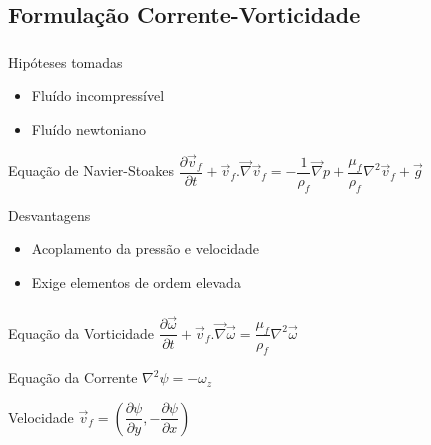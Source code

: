 \documentclass{beamer}
\begin{document}
\subsection{Formulação Corrente-Vorticidade}
\begin{frame}
  \frametitle{\subsecname}
  
  \begin{block}{Hipóteses tomadas}
    \begin{itemize}
     \item Fluído incompressível
     \item Fluído newtoniano
    \end{itemize}
  \end{block}
  
  \begin{block}{Equação de Navier-Stoakes}
    \centering
    $\dfrac{\partial \vec{v}_f}{\partial t} + \vec{v}_f.\vec{\nabla}\vec{v}_f =
    -\dfrac{1}{\rho_f} \vec{\nabla}p + \dfrac{\mu_f}{\rho_f} \nabla^2\vec{v}_f + \vec{g}$
  \end{block}
  
  \begin{block}{Desvantagens}
    \begin{itemize}
     \item Acoplamento da pressão e velocidade
     \item Exige elementos de ordem elevada
    \end{itemize}
  \end{block}

\end{frame}


\begin{frame}
  \frametitle{\subsecname}
  
  \begin{block}{Equação da Vorticidade}
    \centering
    $\dfrac{\partial \vec{\omega}}{\partial t} + \vec{v}_f.\vec{\nabla}\vec{\omega} = \dfrac{\mu_f}{\rho_f} \nabla^2 \vec{\omega}$
  \end{block}
  
  \begin{block}{Equação da Corrente}
    \centering
    $\nabla^2\psi = -\omega_z$
  \end{block}
  
  \begin{block}{Velocidade}
    \centering
    $\vec{v}_f = \left(\dfrac{\partial \psi}{\partial y}, -\dfrac{\partial \psi}{\partial x} \right)$
  \end{block}

\end{frame}
\end{document}
